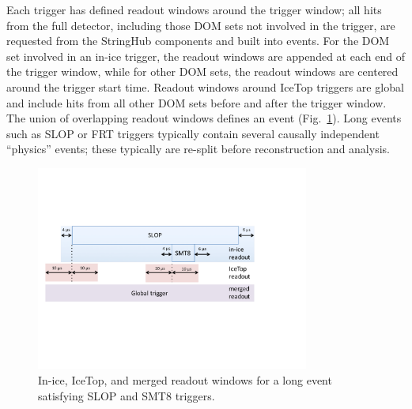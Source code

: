 Each trigger has defined readout windows around the trigger window; all
hits from the full detector, including those DOM sets not involved in the trigger,
are requested from the StringHub components and built into events.  For the
DOM set involved in an in-ice trigger, the readout windows are appended at each end of the trigger
window, while for other DOM sets, the readout windows are centered around
the trigger start time.  Readout windows around IceTop triggers are global
and include hits from all other DOM sets before and after the trigger
window. The union of overlapping readout windows defines 
an event (Fig.~\ref{fig:trigger_readout}).  Long events such as SLOP or FRT
triggers typically contain several causally independent ``physics'' events;
these typically are re-split before reconstruction and analysis.

\begin{figure}[!ht]
 \centering
 \includegraphics[width=0.8\textwidth]{graphics/online/trigger/trigger_readout}
 \caption{In-ice, IceTop, and merged readout windows for a long event
   satisfying SLOP and SMT8 triggers.}
 \label{fig:trigger_readout}
\end{figure}


